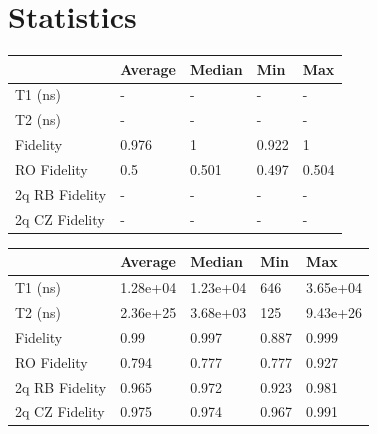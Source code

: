 \documentclass[9pt,a4paper]{src/templates/tau-class/tau}
\begin{document}
\newpage
\section{Statistics} 

\renewcommand{\arraystretch}{1.2}

\noindent\begin{minipage}{0.49\textwidth}
{\small
\begin{center}
\begin{tabular}{@{}p{1.8cm}p{1.3cm}p{1.2cm}p{1.2cm}p{1.2cm}@{}}
\toprule
 & Average & Median & Min & Max \\
\midrule
T1 (ns) & - & - & - & - \\
T2 (ns) & - & - & - & - \\
Fidelity & 0.976 & 1 & 0.922 & 1 \\
RO Fidelity  & 0.5 & 0.501 & 0.497 & 0.504 \\
2q RB Fidelity & - & - & - & - \\
2q CZ Fidelity & - & - & - & - \\
\bottomrule
\end{tabular}
\end{center}
}
\end{minipage}
\hfill
\noindent\begin{minipage}{0.49\textwidth}
{\small
\begin{center}
\begin{tabular}{@{}p{1.8cm}p{1.3cm}p{1.2cm}p{1.2cm}p{1.2cm}@{}}
\toprule
 & Average & Median & Min & Max \\
\midrule
T1 (ns) & 1.28e+04 & 1.23e+04 & 646 & 3.65e+04 \\
T2 (ns) & 2.36e+25 & 3.68e+03 & 125 & 9.43e+26 \\
Fidelity  & 0.99 & 0.997 & 0.887 & 0.999 \\
RO Fidelity  & 0.794 & 0.777 & 0.777 & 0.927 \\
2q RB Fidelity & 0.965 & 0.972 & 0.923 & 0.981 \\
2q CZ Fidelity & 0.975 & 0.974 & 0.967 & 0.991 \\
\bottomrule
\end{tabular}
\end{center}
}
\end{minipage}
\end{document}
